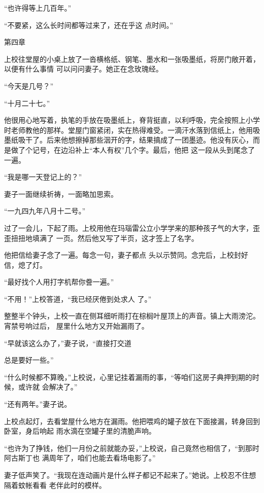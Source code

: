 \documentclass{article}
\begin{document}
“也许得等上几百年。” 

“不要紧，这么长时间都等过来了，还在乎这
点时间。” 

\newpage



第四章 

上校往堂屋的小桌上放了一沓横格纸、钢笔、墨水和一张吸墨纸，将房门敞开着，以便有什么事情
可以问问妻子。她正在念玫瑰经。 


“今天是几号？” 


“十月二十七。” 

他很用心地写着，执笔的手放在吸墨纸上，脊背挺直，以利呼吸，完全按照上小学时老师教他的那样。堂屋门窗紧闭，实在热得难受。一滴汗水落到信纸上，他用吸墨纸吸干了。后来他想擦掉那些洇开的字，结果搞成了一团墨迹。他没有灰心，而是做了个记号，在边沿补上“本人有权”几个字。最后，他把
这一段从头到尾念了一遍。 


“我是哪一天登记上的？” 

\newpage


妻子一面继续祈祷，一面略加思索。 


“一九四九年八月十二号。” 

过了一会儿，下起了雨。上校用他在玛瑙雷公立小学学来的那种孩子气的大字，歪歪扭扭地填满了
一页。然后他又写了半页，这才签上了名字。 

他把信给妻子念了一遍。每念一句，妻子都点
头以示赞同。念完后，上校封好信，熄了灯。 


“最好找个人用打字机帮你誊一遍。” 

“不用！”上校答道，“我已经厌倦到处求人
了。” 

整整半个钟头，上校一直在侧耳细听雨打在棕榈叶屋顶上的声音。镇上大雨滂沱。宵禁号响过后，
屋里什么地方又开始漏雨了。 

“早就该这么办了，”妻子说，“直接打交道
\newpage

总是要好一些。” 

“什么时候都不算晚，”上校说，心里记挂着漏雨的事，“等咱们这房子典押到期的时候，或许就
会解决了。” 


“还有两年。”妻子说。 

上校点起灯，去看堂屋什么地方在漏雨。他把喂鸡的罐子放在下面接漏，转身回到卧室，身后响起
雨水滴在空罐子里的清脆声响。 

“也许为了挣钱，他们一月份之前就能办妥，”上校说，自己竟然也相信了，“到那时阿古斯丁也
满周年了，咱们也能去看场电影了。” 

妻子低声笑了。“我现在连动画片是什么样子都记不起来了。”她说。上校忍不住想隔着蚊帐看看
老伴此时的模样。 


\newpage
\end{document}
